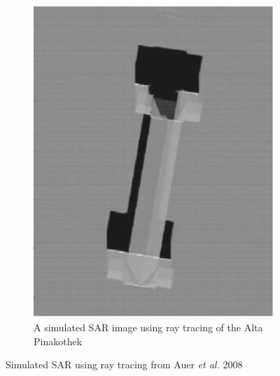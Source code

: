 \begin{figure}
\begin{subfigure}{.5\textwidth}
	\includegraphics[width=0.9\linewidth]{../figures/auer_2008_all_reflections}	
	\caption{A simulated SAR image using ray tracing of the Alta Pinakothek}
	\label{fig:auer_2008_all}
\end{subfigure}
\caption{Simulated SAR using ray tracing from Auer \textit{et al.} 2008 \cite{auerRayTracingSimulating2008}}
\label{fig:auer_2008_ray_tracing}
	
\end{figure}


